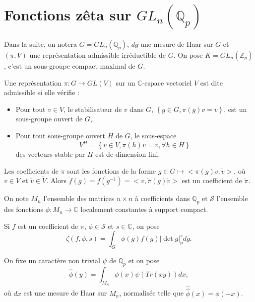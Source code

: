 \section{Fonctions zêta sur $GL_n(\mathbb{Q}_p)$}

Dans la suite, on notera $G = GL_n(\mathbb{Q}_p)$, $dg$ une mesure de Haar sur $G$ et $(\pi, V)$ une représentation admissible irréductible de $G$. On pose $K=GL_n(\mathbb{Z}_p)$, c'est un sous-groupe compact maximal de $G$.

\begin{definition}
Une représentation $\pi : G \rightarrow GL(V)$ sur un $\mathbb{C}$-espace vectoriel $V$ est dite admissible si elle vérifie :
\begin{itemize}
\item Pour tout $v \in V$, le stabilisateur de $v$ dans $G$, $\left\lbrace g \in G, \pi(g)v = v \right\rbrace$, est un sous-groupe ouvert de $G$,
\item Pour tout sous-groupe ouvert $H$ de $G$, le sous-espace
\begin{equation*}
V^H=\left\lbrace v \in V, \pi(h)v = v, \forall h \in H \right\rbrace
\end{equation*}
des vecteurs stable par $H$ est de dimension fini.
\end{itemize}
\end{definition}

Les coefficients de $\pi$ sont les fonctions de la forme $g \in G \mapsto <\pi(g)v, \tilde{v}>$, où $v \in V$ et $\tilde{v} \in \tilde{V}$. Alors $\check{f}(g)=f(g^{-1})=<v, \tilde{\pi}(g)\tilde{v}>$ est un coefficient de $\tilde{\pi}$.

On note $M_n$ l'ensemble des matrices $n \times n$ à coefficients dans $\mathbb{Q}_p$ et $\mathcal{S}$ l'ensemble des fonctions $\phi : M_n \rightarrow \mathbb{C}$ localement constantes à support compact.

Si $f$ est un coefficient de $\pi$, $\phi \in \mathcal{S}$ et $s \in \mathbb{C}$, on pose
\begin{equation}
\zeta(f, \phi, s) = \int_G \phi(g)f(g)|\det g|_p^s dg.
\end{equation}

On fixe un caractère non trivial $\psi$ de $\mathbb{Q}_p$ et on pose
\begin{equation}
\hat{\phi}(y) = \int_{M_n} \phi(x) \psi(Tr(xy)) dx,
\end{equation}
où $dx$ est une mesure de Haar sur $M_n$, normalisée telle que $\hat{\hat{\phi}}(x)=\phi(-x)$.

